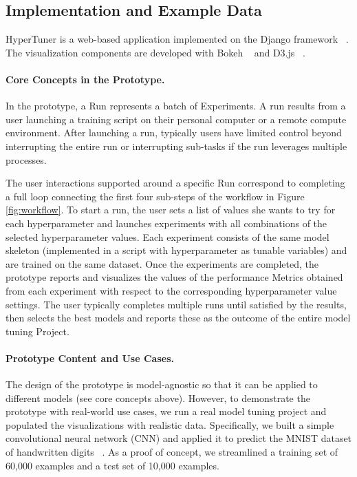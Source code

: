 \documentclass[preprint]{vgtc}        %
\newcommand{\skye}[1]{{ #1}}
\begin{document}
\subsection{Implementation and Example Data}
HyperTuner is a web-based application implemented on the Django framework ~\cite{TheDjango}. The visualization components are developed with Bokeh ~\cite{WelcomeDocumentation} and D3.js ~\cite{D3.jsDocuments}.

\paragraph{Core Concepts in the Prototype.}
In the prototype, a \textsf{Run} represents a batch of \textsf{Experiments}. A run results from a user launching a training script on their personal computer or a remote compute environment. After launching a run, typically users have limited control beyond interrupting the entire run or interrupting sub-tasks if the run leverages multiple processes.

The user interactions supported around a specific \textsf{Run} correspond to completing a full loop connecting the first four sub-steps of the workflow in Figure \ref{fig:workflow}. To start a run, the user sets a list of values she wants to try for each hyperparameter and launches experiments with all combinations of the selected hyperparameter values. Each experiment consists of the same model \skye{skeleton (implemented in a script with hyperparameter as tunable variables)} and are trained on the same dataset. Once the experiments are completed, the prototype reports and visualizes the values of the performance \textsf{Metrics} obtained from each experiment with respect to the corresponding hyperparameter value settings. The user typically completes multiple runs until satisfied by the results, then selects the best models and reports these as the outcome of the entire model tuning \textsf{Project}.

\paragraph{Prototype Content and Use Cases.}
The design of the prototype is model-agnostic so that it can be applied to different models (see core concepts above). However, to demonstrate the prototype with real-world use cases, we run a real model tuning project and populated the visualizations with realistic data. Specifically, we built a simple convolutional neural network (CNN) and applied it to predict the MNIST dataset of handwritten digits ~\cite{MNISTBurges}. As a proof of concept, we streamlined a training set of 60,000 examples and a test set of 10,000 examples. 
\end{document}
